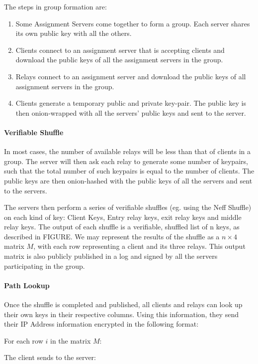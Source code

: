 The steps in group formation are: 
\begin{enumerate} 
\item Some Assignment Servers come together to form a group. Each server shares 
its own public key with all the others. 
\item Clients connect to an assignment server that is accepting clients and 
download the public keys of all the assignment servers in the group.
\item Relays connect to an assignment server and download the public
keys of all assignment servers in the group. 
\item Clients generate a temporary public and private key-pair. The public key 
is then onion-wrapped with all the servers' public keys and sent to the server.
\end{enumerate}

\paragraph{Verifiable Shuffle} 
In most cases, the number of available relays will be less than that of clients 
in a group. The server will then ask each relay to generate some number of 
keypairs, such that the total number of such keypairs is equal to the number of 
clients. The public keys are then onion-hashed with the public keys of all the 
servers and sent to the servers.

The servers then perform a series of verifiable shuffles (eg. using the Neff
Shuffle) on each kind of key: Client Keys, Entry relay keys, exit relay keys and 
middle relay keys. The output of each shuffle is a verifiable, shuffled list of 
n keys, as described in FIGURE. 
We may represent the results of the shuffle as a $n \times 4$ matrix $M$, with 
each row representing a client and its three relays. This output matrix is also 
publicly published in a log and signed by all the servers participating in the 
group.

\paragraph{Path Lookup}
Once the shuffle is completed and published, all clients and relays can look up
their own keys in their respective columns. Using this information, they send 
their IP Address information encrypted in the following format:

For each row $i$ in the matrix $M$:

The client sends to the server:

